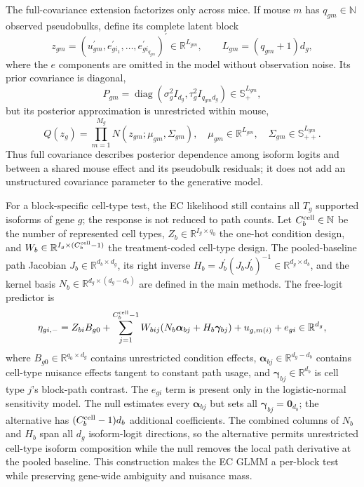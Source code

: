 \documentclass[11pt]{article}
\begin{document}
The full-covariance extension factorizes only across mice. If mouse $m$ has $q_{gm}\in\mathbb N$ observed pseudobulks, define its complete latent block \[
 z_{gm}=(u_{gm}^\prime,e_{gi_1}^\prime,\ldots,e_{gi_{q_{gm}}}^\prime)^\prime
 \in\mathbb R^{L_{gm}},
 \qquad L_{gm}=(q_{gm}+1)d_g,
\]
where the $e$ components are omitted in the model without observation noise. Its prior covariance is diagonal, \[
 P_{gm}=\operatorname{diag}
 (\sigma_g^2 I_{d_g},\tau_g^2 I_{q_{gm}d_g})
 \in\mathbb S_+^{L_{gm}},
\]
but its posterior approximation is unrestricted within mouse, \[
 Q(z_g)=\prod_{m=1}^{M_g}N(z_{gm};\mu_{gm},\Sigma_{gm}),
 \quad \mu_{gm}\in\mathbb R^{L_{gm}},\quad
 \Sigma_{gm}\in\mathbb S_{++}^{L_{gm}}.
\]
Thus full covariance describes posterior dependence among isoform logits and between a shared mouse effect and its pseudobulk residuals; it does not add an unstructured covariance parameter to the generative model.

For a block-specific cell-type test, the EC likelihood still contains all \(T_g\) supported isoforms of gene \(g\); the response is not reduced to path counts. Let \(C_b^{\rm cell}\in\mathbb N\) be the number of represented cell types, \(Z_b\in\mathbb R^{I_g\times q_0}\) the one-hot condition design, and \(W_b\in\mathbb R^{I_g\times(C_b^{\rm cell}-1)}\) the treatment-coded cell-type design. The pooled-baseline path Jacobian \(J_b\in\mathbb R^{d_b\times d_g}\), its right inverse \(H_b=J_b^\prime(J_bJ_b^\prime)^{-1}\in\mathbb R^{d_g\times d_b}\), and the kernel basis \(N_b\in\mathbb R^{d_g\times(d_g-d_b)}\) are defined in the main methods.
The free-logit predictor is \[
 \eta_{gi,-}=Z_{bi}B_{g0}
 +\sum_{j=1}^{C_b^{\rm cell}-1}W_{bij}
   (N_b\bm\alpha_{bj}+H_b\bm\gamma_{bj})
 +u_{g,m(i)}+e_{gi}
 \in\mathbb R^{d_g},
\]
where \(B_{g0}\in\mathbb R^{q_0\times d_g}\) contains unrestricted condition effects, \(\bm\alpha_{bj}\in\mathbb R^{d_g-d_b}\) contains cell-type nuisance effects tangent to constant path usage, and \(\bm\gamma_{bj}\in\mathbb R^{d_b}\) is cell type \(j\)'s block-path contrast. The \(e_{gi}\) term is present only in the logistic-normal sensitivity model. The null estimates every \(\bm\alpha_{bj}\) but sets all \(\bm\gamma_{bj}=\bm0_{d_b}\); the alternative has \((C_b^{\rm cell}-1)d_b\) additional coefficients. The combined columns of \(N_b\) and \(H_b\) span all \(d_g\) isoform-logit directions, so the alternative permits unrestricted cell-type isoform composition while the null removes the local path derivative at the pooled baseline. This construction makes the EC GLMM a per-block test while preserving gene-wide ambiguity and nuisance mass.
\end{document}
